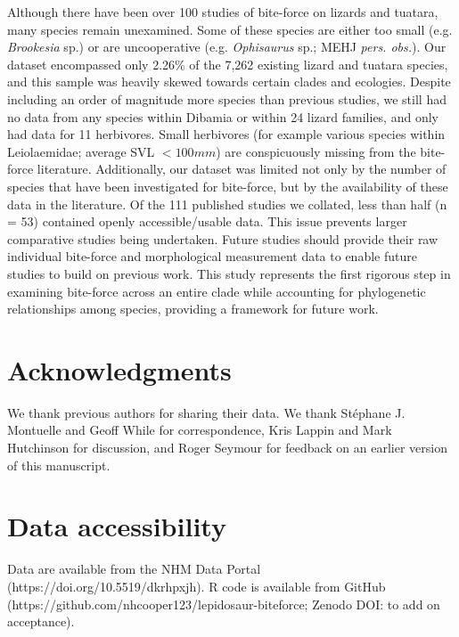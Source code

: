 \documentclass[a4paper, 12pt]{article}
\begin{document}
Although there have been over 100 studies of bite-force on lizards and tuatara, many species remain unexamined. 
Some of these species are either too small (e.g. \textit{Brookesia} sp.) or are uncooperative (e.g. \textit{Ophisaurus} sp.; MEHJ \textit{pers. obs.}). 
Our dataset encompassed only 2.26\% of the 7,262 existing lizard and tuatara species\cite{uetz2020reptile}, and this sample was heavily skewed towards certain clades and ecologies. 
Despite including an order of magnitude more species than previous studies, we still had no data from any species within Dibamia or within 24 lizard families, and only had data for 11 herbivores. 
Small herbivores (for example various species within Leiolaemidae; average SVL $< 100 mm$\cite{espinoza2004recurrent}) are conspicuously missing from the bite-force literature. 
Additionally, our dataset was limited not only by the number of species that have been investigated for bite-force, but by the availability of these data in the literature. Of the 111 published studies we collated, less than half (n = 53) contained openly accessible/usable data. 
This issue prevents larger comparative studies being undertaken. 
Future studies should provide their raw individual bite-force and morphological measurement data to enable future studies to build on previous work. 
This study represents the first rigorous step in examining bite-force across an entire clade while accounting for phylogenetic relationships among species, providing a framework for future work. 


\section{Acknowledgments}
We thank previous authors for sharing their data. We thank  St\'ephane J. Montuelle and Geoff While for correspondence, Kris Lappin and Mark Hutchinson for discussion, and Roger Seymour for feedback on an earlier version of this manuscript.

\section{Data accessibility}
Data are available from the NHM Data Portal (https://doi.org/10.5519/dkrhpxjh\cite{lepidosaurdata}). 
R code is available from GitHub (https://github.com/nhcooper123/lepidosaur-biteforce; Zenodo DOI: to add on acceptance).
\end{document}
